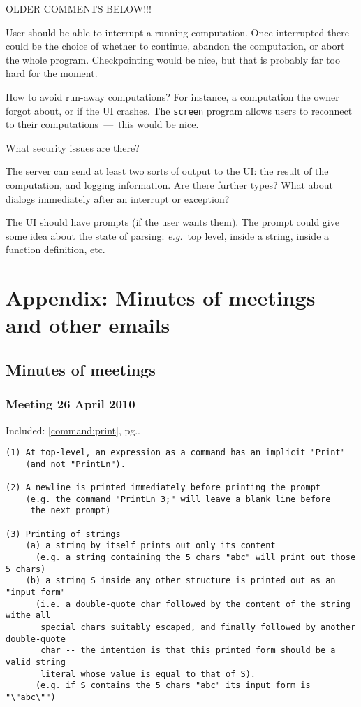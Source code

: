 \documentclass{book}[12,a4paper]
\def\eg{{\it e.g.}}
\def\refandpage#1{{\ref{#1}, pg.\pageref{#1}}}
\begin{document}
OLDER COMMENTS BELOW!!!

User should be able to interrupt a running computation.  Once
interrupted there could be the choice of whether to continue,
abandon the computation, or abort the whole program.  Checkpointing
would be nice, but that is probably far too hard for the moment.

How to avoid run-away computations?  For instance, a computation the
owner forgot about, or if the UI crashes.  The \texttt{screen} program
allows users to reconnect to their computations~---~this would be nice.

What security issues are there?

The server can send at least two sorts of output to the UI: the result
of the computation, and logging information.  Are there further types?
What about dialogs immediately after an interrupt or exception?

The UI should have prompts (if the user wants them).  The prompt could
give some idea about the state of parsing: \eg~top level, inside a
string, inside a function definition, etc.

\part{Appendix: Minutes of meetings and other emails}

\small
\chapter{Minutes of meetings}

\section{Meeting 26 April 2010}\label{26Apr2010}

Included: \refandpage{command:print}.
\begin{verbatim}
(1) At top-level, an expression as a command has an implicit "Print"
    (and not "PrintLn").

(2) A newline is printed immediately before printing the prompt
    (e.g. the command "PrintLn 3;" will leave a blank line before
     the next prompt)

(3) Printing of strings
    (a) a string by itself prints out only its content
      (e.g. a string containing the 5 chars "abc" will print out those 5 chars)
    (b) a string S inside any other structure is printed out as an "input form"
      (i.e. a double-quote char followed by the content of the string withe all
       special chars suitably escaped, and finally followed by another double-quote
       char -- the intention is that this printed form should be a valid string
       literal whose value is equal to that of S).
      (e.g. if S contains the 5 chars "abc" its input form is "\"abc\"")
\end{verbatim}
\end{document}
